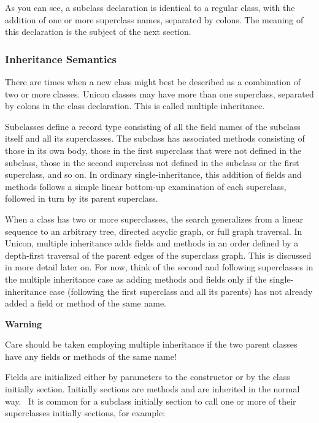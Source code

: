 As you can see, a subclass declaration is identical to a regular class,
with the addition of one or more superclass names, separated by colons.
The meaning of this declaration is the subject of the next section. 

\subsubsection[Inheritance Semantics]{Inheritance Semantics}

There are times when a new class might best
be described as a combination of two or more classes. Unicon classes
may have more than one superclass, separated by colons in the class
declaration. This is called multiple inheritance.

Subclasses define a record type consisting of all the field names of the
subclass itself and all its superclasses. The subclass has associated
methods consisting of those in its own body, those in the first
superclass that were not defined in the subclass, those in the second
superclass not defined in the subclass or the first superclass, and so
on. In ordinary single-inheritance, this addition of fields and methods
follows a simple linear bottom-up examination of each superclass,
followed in turn by its parent superclass. 

When a class has two or more superclasses, the search generalizes from a
linear sequence to an arbitrary tree, directed acyclic
graph, or full graph traversal. In Unicon,
multiple inheritance adds fields and
methods in an order defined by a depth-first traversal of the parent
edges of the superclass graph. This is discussed in more detail later
on. For now, think of the second and following superclasses in the
multiple inheritance case as adding methods and fields only if the
single-inheritance case (following the first superclass and all its
parents) has not already added a field or method of the same name. 

{\sffamily\bfseries
Warning}

{\sffamily
Care should be taken employing multiple inheritance if the two parent
classes have any fields or methods of the same name! }

Fields are initialized either by parameters to the constructor or by the
class initially section. Initially sections are methods and are
inherited in the normal way. \ It is common for a subclass initially
section to call one or more of their superclasses{\textquotesingle}
initially sections, for example:

